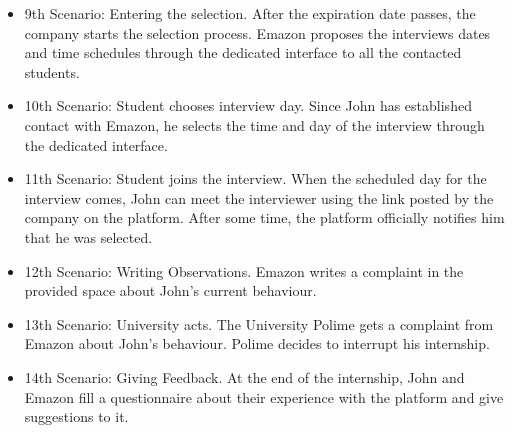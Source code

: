 \documentclass{article}
\begin{document}
\begin{itemize}
        \item 9th Scenario: Entering the selection. After the expiration date passes, the company starts the selection process. Emazon proposes the interviews dates and time schedules through the dedicated interface to all the contacted students.
        \item 10th Scenario: Student chooses interview day. Since John has established contact with Emazon, he selects the time and day of the interview through the dedicated interface.
        \item 11th Scenario: Student joins the interview. When the scheduled day for the interview comes, John can meet the interviewer using the link posted by the company on the platform. After some time, the platform officially notifies him that he was selected.
        \item 12th Scenario: Writing Observations. Emazon writes a complaint in the provided space about John's current behaviour.
        \item 13th Scenario: University acts. The University Polime gets a complaint from Emazon about John's behaviour. Polime decides to interrupt his internship.
        \item 14th Scenario: Giving Feedback. At the end of the internship, John and Emazon fill a questionnaire about their experience with the platform and give suggestions to it.
    \end{itemize}
\end{document}
